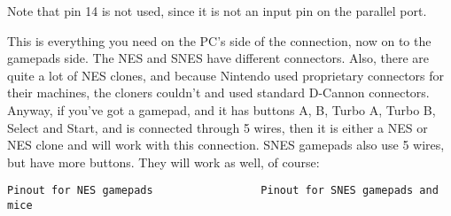 \documentclass[a4paper,8pt,english]{sphinxmanual}
\begin{document}
Note that pin 14 is not used, since it is not an input pin on the parallel
port.

This is everything you need on the PC's side of the connection, now on to
the gamepads side. The NES and SNES have different connectors. Also, there
are quite a lot of NES clones, and because Nintendo used proprietary
connectors for their machines, the cloners couldn't and used standard D-Cannon
connectors. Anyway, if you've got a gamepad, and it has buttons A, B, Turbo
A, Turbo B, Select and Start, and is connected through 5 wires, then it is
either a NES or NES clone and will work with this connection. SNES gamepads
also use 5 wires, but have more buttons. They will work as well, of course:

\begin{Verbatim}[commandchars=\\\{\}]
Pinout for NES gamepads                 Pinout for SNES gamepads and mice


\end{Verbatim}
\end{document}
